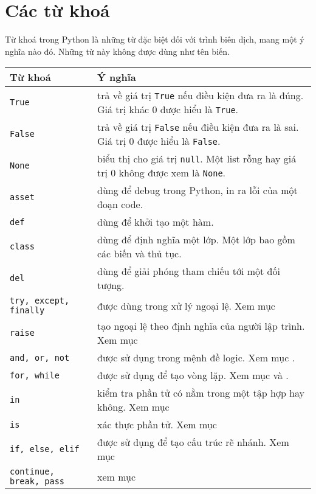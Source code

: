 \section{Các từ khoá}
\label{keyword}
Từ khoá trong Python là những từ đặc biệt đối với trình biên dịch, mang một ý nghĩa nào đó. Những từ này không được dùng như tên biến.
\begin{table}[h]
	\centering
	\begin{tabular}{|l||l|}
		\hline
		Từ khoá & Ý nghĩa \\
		\hline
		\hline
		\texttt{True} & trả về giá trị \texttt{True} nếu điều kiện đưa ra là đúng. Giá trị khác 0 được hiểu là \texttt{True}. \\
		\hline
		\texttt{False} & trả về giá trị \texttt{False} nếu điều kiện đưa ra là sai. Giá trị 0 được hiểu là \texttt{False}.\\
		\hline
		\texttt{None} & biểu thị cho giá trị \texttt{null}. Một list rỗng hay giá trị 0 không được xem là \texttt{None}.\\
		\hline
		\texttt{asset} & dùng để debug trong Python, in ra lỗi của một đoạn code.\\
		\hline
		\texttt{def} & dùng để khởi tạo một hàm.\\
		\hline
		\texttt{class}& dùng để định nghĩa một lớp. Một lớp bao gồm các biến và thủ tục.\\
		\hline
		\texttt{del}& dùng để giải phóng tham chiếu tới một đối tượng.\\
		\hline
		\texttt{try, except, finally}& được dùng trong xử lý ngoại lệ. Xem mục \nameref{exception}\\
		\hline
		\texttt{raise}& tạo ngoại lệ theo định nghĩa của người lập trình. Xem mục \nameref{exception}\\
		\hline
		\texttt{and, or, not}& được sử dụng trong mệnh đề logic. Xem mục \nameref{logic}.\\
		\hline
		\texttt{for, while}& được sử dụng để tạo vòng lặp. Xem mục \nameref{for} và \nameref{while}.\\
		\hline
		\texttt{in}& kiểm tra phần tử có nằm trong một tập hợp hay không. Xem mục \nameref{kt}\\
		\hline
		\texttt{is}& xác thực phần tử. Xem mục \nameref{xt}\\
		\hline
		\texttt{if, else, elif}& được sử dụng để tạo cấu trúc rẽ nhánh. Xem mục \nameref{condition}\\
		\hline
		\texttt{continue, break, pass}& xem mục \nameref{keyloop}\\
		\hline

\end{tabular}
\end{table}
